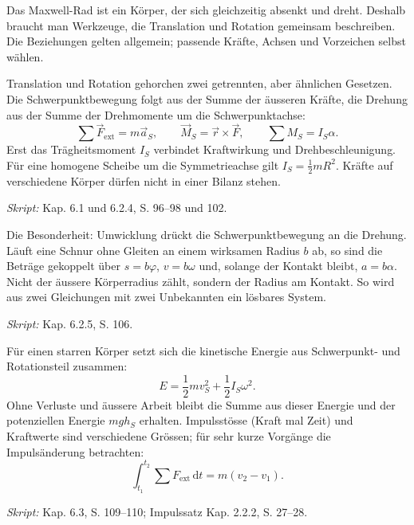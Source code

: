 
Das Maxwell-Rad ist ein Körper, der sich gleichzeitig absenkt und dreht.
Deshalb braucht man Werkzeuge, die Translation und Rotation gemeinsam
beschreiben. Die Beziehungen gelten allgemein; passende Kräfte, Achsen und
Vorzeichen selbst wählen.

\begin{werkzeugkasten}
Translation und Rotation gehorchen zwei getrennten, aber ähnlichen Gesetzen.
Die Schwerpunktbewegung folgt aus der Summe der äusseren Kräfte, die Drehung
aus der Summe der Drehmomente um die Schwerpunktachse:
\begin{equation}
  \sum \vec F_{\mathrm{ext}}=m\vec a_S,
  \qquad
  \vec M_S=\vec r\times\vec F,
  \qquad
  \sum M_S=I_S\alpha .
\end{equation}
Erst das Trägheitsmoment $I_S$ verbindet Kraftwirkung und Drehbeschleunigung.
Für eine homogene Scheibe um die Symmetrieachse gilt $I_S=\frac12 mR^2$.
Kräfte auf verschiedene Körper dürfen nicht in einer Bilanz stehen.

\textit{Skript:} Kap. 6.1 und 6.2.4, S. 96--98 und 102.
\end{werkzeugkasten}

\begin{werkzeugkasten}
Die Besonderheit: Umwicklung drückt die Schwerpunktbewegung an die Drehung.
Läuft eine Schnur ohne Gleiten an einem wirksamen Radius $b$ ab, so sind die
Beträge gekoppelt über $s=b\varphi$, $v=b\omega$ und, solange der Kontakt
bleibt, $a=b\alpha$. Nicht der äussere Körperradius zählt, sondern der Radius
am Kontakt. So wird aus zwei Gleichungen mit zwei Unbekannten ein lösbares
System.

\textit{Skript:} Kap. 6.2.5, S. 106.
\end{werkzeugkasten}

\begin{werkzeugkasten}
Für einen starren Körper setzt sich die kinetische Energie aus
Schwerpunkt- und Rotationsteil zusammen:
\begin{equation}
  E=\frac12 mv_S^2+\frac12 I_S\omega^2.
\end{equation}
Ohne Verluste und äussere Arbeit bleibt die Summe aus dieser Energie und der
potenziellen Energie $mgh_S$ erhalten. Impulsstösse (Kraft mal Zeit) und
Kraftwerte sind verschiedene Grössen; für sehr kurze Vorgänge die
Impulsänderung betrachten:
\begin{equation}
  \int_{t_1}^{t_2}\sum F_{\mathrm{ext}}\,\mathrm dt=m(v_2-v_1).
\end{equation}

\textit{Skript:} Kap. 6.3, S. 109--110; Impulssatz Kap. 2.2.2, S. 27--28.
\end{werkzeugkasten}


